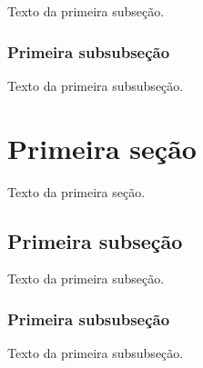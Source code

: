 \documentclass[a4paper,12pt,oneside,onecolumn,final,fleqn]{repUERJ}
\begin{document}
	Texto da primeira subseção.
	
	\subsubsection{Primeira subsubseção}
	
	Texto da primeira subsubseção.
	
	
	\section{Primeira seção}
	
	Texto da primeira seção.
	
	\subsection{Primeira subseção}
	
	Texto da primeira subseção.
	
	\subsubsection{Primeira subsubseção}
	
	Texto da primeira subsubseção.
	
\end{document}
